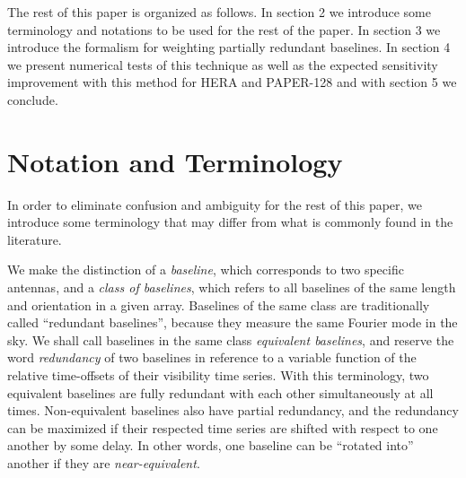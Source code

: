 \documentclass[twocolumn,apj,numberedappendix]{emulateapj}
\renewcommand\[{\begin{equation}}
\renewcommand\]{\end{equation}}
\begin{document}
The rest of this paper is organized as follows. In section 2 we introduce some terminology and notations to be used for the rest of the paper. In section
3 we introduce the formalism for weighting partially redundant baselines.
In section 4 we present numerical tests of
this technique as well as the expected sensitivity improvement
with this method for HERA and PAPER-128 and with section 5 we conclude. 

\section{Notation and Terminology}

In order to eliminate confusion and ambiguity for the rest of this paper, we
introduce some terminology that may differ from what is commonly found in the literature. 

We make the distinction of a \textit{baseline}, which corresponds to two specific antennas, and a \textit{class of baselines}, which refers to all baselines of the same length and orientation in a given array. 
Baselines of the same class are traditionally called
``redundant baselines'', because they measure the same Fourier mode
in the sky.  We shall call baselines in the same class \textit{equivalent baselines}, and reserve the word \textit{redundancy} of two baselines in reference to a variable function of the relative time-offsets of their visibility time series. With this terminology, two equivalent
baselines are fully redundant with each other simultaneously at all
times. Non-equivalent baselines also have partial redundancy, and the redundancy can be maximized if their
respected time series are shifted with respect to one another by some delay. In other words, one baseline can be ``rotated into''
another if they are \textit{near-equivalent}.
\end{document}
